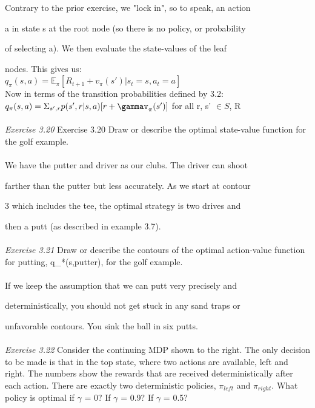 \documentclass{article}
\begin{document}
Contrary to the prior exercise, we "lock in", so to speak, an action 

a in state s at the root node (so there is no policy, or probability

of selecting a). We then evaluate the state-values of the leaf 

nodes. This gives us: \\

$q_{\pi}(s, a) = \mathbb{E}_{\pi}[R_{t+1} + v_{\pi}(s')|s_t=s, a_{t}=a]$ \\

Now in terms of the transition probabilities defined by 3.2: \\

$q_\pi(s, a) = \Sigma_{s', r}p(s', r|s, a)[r + \gammav_{\pi}(s')]$ for all r, s' $\in S$, R\\
\\

\textit{Exercise 3.20} Exercise 3.20 Draw or describe the optimal state-value function for the golf example. \\
\\

We have the putter and driver as our clubs. The driver can shoot 

farther than the putter but less accurately. As we start at contour 

3 which includes the tee, the optimal strategy is two drives and 

then a putt (as described in example 3.7).\\
\\
\textit{Exercise 3.21} Draw or describe the contours of the optimal action-value function for putting, q_{*}(s,putter), for the golf example.  \\
\\

If we keep the assumption that we can putt very precisely and 

deterministically, you should not get stuck in any sand traps or 

unfavorable contours. You sink the ball in six putts. \\
\\
\textit{Exercise 3.22} Consider the continuing MDP shown to the
right. The only decision to be made is that in the top state,
where two actions are available, left and right. The numbers
show the rewards that are received deterministically after
each action. There are exactly two deterministic policies,
$\pi_{left}$ and  $\pi_{right}$. What policy is optimal if $\gamma$ = 0? If $\gamma$ = 0.9? If  $\gamma$ = 0.5?  \\
\\
\end{document}
